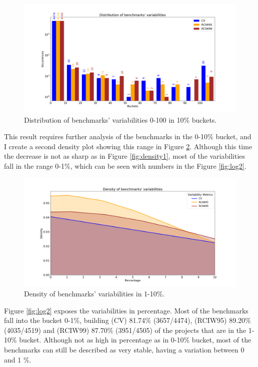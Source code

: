\documentclass{seal_thesis}
\begin{document}
\begin{figure}[H]
	\centering
	\includegraphics[width=\linewidth]{resultsvis/log1}
	\caption{Distribution of benchmarks' variabilities 0-100 in 10\% buckets.}
	\label{fig:log1}
\end{figure}

\noindent This result requires further analysis of the benchmarks in the 0-10\% bucket, and I create a second density plot showing this range in Figure \ref{fig:density2}. Although this time the decrease is not as sharp as in Figure \ref{fig:density1}, most of the variabilities fall in the range 0-1\%, which can be seen with numbers in the Figure \ref{fig:log2}.

\begin{figure}[H]
	\centering
	\includegraphics[width=\linewidth]{resultsvis/density_controlled2}
	\caption{Density of benchmarks' variabilities in 1-10\%.}
	\label{fig:density2}
\end{figure}

Figure \ref{fig:log2} exposes the variabilities in percentage. Most of the benchmarks fall into the bucket 0-1\%, building (CV) 81.74\% (3657/4474), (RCIW95) 89.20\% (4035/4519) and (RCIW99) 87.70\% (3951/4505) of the projects that are in the 1-10\% bucket. Although not as high in percentage as in 0-10\% bucket, most of the benchmarks can still be described as very stable, having a variation between 0 and 1 \%.
\end{document}
